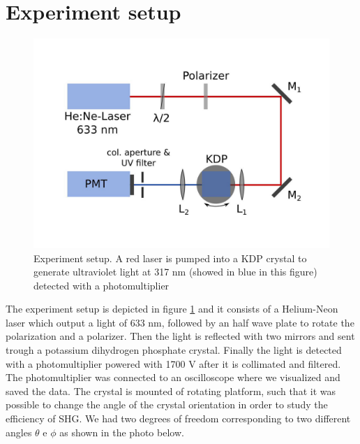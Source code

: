 \documentclass[a4paper,10pt]{article}
\begin{document}
\section{Experiment setup}
\begin{figure}[H]
\centering
\includegraphics[width=.6\textwidth]{setup}
\caption{Experiment setup. A red laser is pumped into a KDP crystal to generate ultraviolet light at 317 nm (showed in blue in this figure) detected with a photomultiplier}\label{setup}
\end{figure}
The experiment setup is depicted in figure \ref{setup} and it consists of a Helium-Neon laser which output a light of 633 nm, followed by an half wave plate to rotate the polarization and a polarizer. Then the light is reflected with two mirrors and sent trough a potassium dihydrogen phosphate crystal. Finally the light is detected with a photomultiplier powered with 1700 V after it is collimated and filtered. The photomultiplier was connected to an oscilloscope where we visualized and saved the data. The crystal is mounted of rotating platform, such that it was possible to change the angle of the crystal orientation in order to study the efficiency of SHG. We had two degrees of freedom corresponding to two different angles $\theta$ e $\phi$ as shown in the photo below. 
\end{document}
